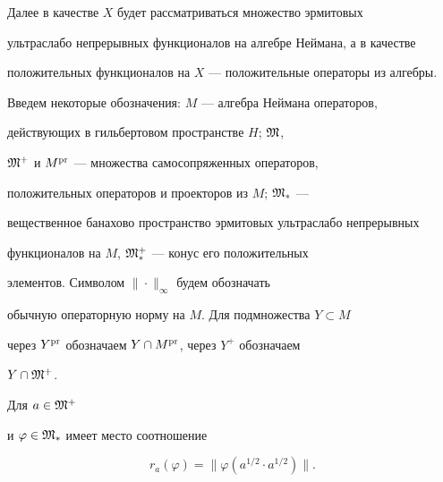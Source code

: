 Далее в качестве $X$ будет рассматриваться множество эрмитовых 


ультраслабо непрерывных функционалов на алгебре Неймана, а в качестве 


положительных функционалов на $X$ --- положительные операторы из алгебры. 





Введем некоторые обозначения: $M$ --- алгебра Неймана операторов, 


действующих в гильбертовом пространстве $H$; $\frak M$, 


${\frak M}^+$ и $M^{\operatorname{pr}}$ --- множества самосопряженных операторов, 


положительных операторов и проекторов из $M$; ${\frak M}_*$ --- 


вещественное банахово пространство эрмитовых ультраслабо непрерывных 


функционалов на $M$, ${\frak M}_*^+$ --- конус его положительных 


элементов. Символом $\| \cdot \|_{\infty}$ будем обозначать 


обычную операторную норму на $M$. Для подмножества $Y \subset M $ 


через $Y^{\operatorname{pr}}$ обозначаем $Y \cap M^{\operatorname{pr}}$, через $Y^+$ обозначаем  


$Y \cap \frak M^+$. 





\begin{prop}


Для $a \in {\frak M}^+$ 


и $\varphi \in {\frak M}_*$ имеет место соотношение


\begin{equation}


r_a (\varphi)=\| \varphi (a^{1/2} \cdot a^{1/2}) \|.     


\end{equation}


\end{prop}






